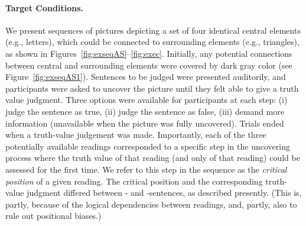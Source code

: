 \documentclass[fleqn,reqno,10pt]{article}
\newcommand{\as}{\acro{as}}
\renewcommand{\es}{\acro{es}}
\begin{document}
\paragraph{Target Conditions.} We present sequences of pictures
depicting a set of four identical central elements (e.g., letters),
which could be connected to surrounding elements (e.g., triangles), as
shown in Figures~\ref{fig:exseqAS}--\ref{fig:exec}. Initially,
any potential connections between central and surrounding elements
were covered by dark gray color (see
Figure~\ref{fig:exseqAS1}). Sentences to be judged were presented
auditorily, and participants were asked to uncover the picture until
they felt able to give a truth value judgment. Three options were
available for participants at each step: (i) judge the sentence as
true, (ii) judge the sentence as false, (iii) demand more information
(unavailable when the picture was fully uncovered). Trials ended when
a truth-value judgement was made. Importantly, each of the three
potentially available readings corresponded to a specific step in the
uncovering process where the truth value of that reading (and only of
that reading) could be assessed for the first time. We refer to this
step in the sequence as the {\it critical position} of a given
reading. The critical position and the corresponding truth-value
judgment differed between \as- and \es-sentences, as described
presently. (This is, partly, because of the logical dependencies
between readings, and, partly, also to rule out positional biases.)
\end{document}
